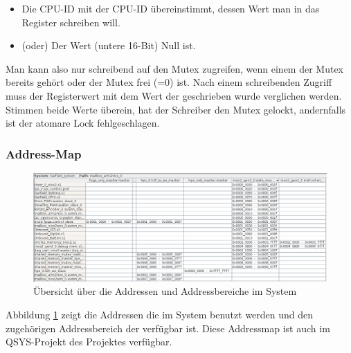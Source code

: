 \begin{itemize}
	\begin{itemize}
		\item Die CPU-ID mit der CPU-ID übereinstimmt, dessen Wert man in das Register schreiben will.
		\item (oder) Der Wert (untere 16-Bit) Null ist.
	\end{itemize}
	Man kann also nur schreibend auf den Mutex zugreifen, wenn einem der Mutex bereits gehört oder der Mutex frei (=0) ist. Nach einem schreibenden Zugriff muss der Registerwert mit dem Wert der geschrieben wurde verglichen werden. Stimmen beide Werte überein, hat der Schreiber den Mutex gelockt, andernfalls ist der atomare Lock fehlgeschlagen.
\end{itemize}

\subsubsection{Address-Map}

\begin{figure}
	\includegraphics[width=\textwidth]{Abb/Address_Map.png}
	\caption{Übersicht über die Addressen und Addressbereiche im System}
	\label{FPGA:AddrMap}
\end{figure}

Abbildung \ref{FPGA:AddrMap} zeigt die Addressen die im System benutzt werden und den zugehörigen Addressbereich der verfügbar ist. Diese Addressmap ist auch im QSYS-Projekt des Projektes verfügbar.
